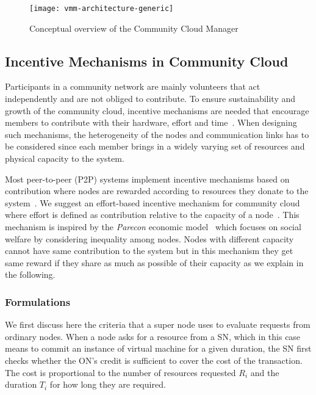 \begin{figure}[htb]
   \centering
   \texttt{[image: vmm-architecture-generic]}
   \caption{Conceptual overview of the Community Cloud Manager}
   \label{fig:overview-vmm-hierarchy}
\end{figure}


\subsection{Incentive Mechanisms in Community Cloud}
\label{sec:incentives-architecture}

Participants in a community network are mainly volunteers that act independently and are not obliged to contribute. 
To ensure sustainability and growth of the community cloud, incentive mechanisms are needed that encourage members to contribute with their hardware, effort and time~\cite{Biczok2011, Bina2006}.
When designing such mechanisms, the heterogeneity of the nodes and communication links has to be considered since each member brings in a widely varying set of resources and physical capacity to the system.

Most peer-to-peer (P2P) systems implement incentive mechanisms based on contribution where nodes are rewarded according to resources they donate to the system~\cite{Zhang2010}.
We suggest an effort-based incentive mechanism for community cloud where effort is defined as contribution relative to the capacity of a node~\cite{Buyksahin2013}. 
This mechanism is inspired by the \emph{Parecon} economic model~\cite{Rahman2010, Vega2013Effort, Vega2013Sharing} which focuses on social welfare by considering inequality among nodes. 
Nodes with different capacity cannot have same contribution to the system but in this mechanism they get same reward if they share as much as possible of their capacity as we explain in the following.


\subsubsection{Formulations}

We first discuss here the criteria that a super node uses to evaluate requests from ordinary nodes.
When a node asks for a resource from a SN, which in this case means to commit an instance of virtual machine for a given duration, the SN first checks whether the ON's credit is sufficient to cover the cost of the transaction.
The cost is proportional to the number of resources requested ${ R }_{ i }$ and the duration ${ T }_{ i }$ for how long they are required.

